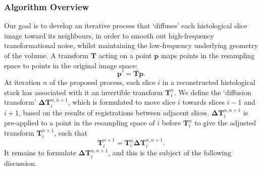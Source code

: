     \subsubsection{Algorithm Overview} %
    \label{ssub:algorithm_overview}
    Our goal is to develop an iterative process that `diffuses' each histological slice image toward its neighbours, in order to smooth out high-frequency transformational noise, whilst maintaining the low-frequency underlying geometry of the volume. A transform $\mathbf{T}$ acting on a point $\mathbf{p}$ maps points in the resampling space to points in the original image space:
  		\begin{equation}
  			\mathbf{p'} = \mathbf{Tp}.
  		\end{equation}
    At iteration $n$ of the proposed process, each slice $i$ in a reconstructed histological stack has associated with it an invertible transform $\mathbf{T}_i^n$. We define the `diffusion transform' $\mathbf{\Delta T}_i^{n,n+1}$, which is formulated to move slice $i$ towards slices $i-1$ and $i+1$, based on the results of registrations between adjacent slices. $\mathbf{\Delta T}_i^{n,n+1}$ is pre-applied to a point in the resampling space of $i$ before $\mathbf{T}_i^n$ to give the adjusted transform $\mathbf{T}_i^{n+1}$, such that
    	\begin{equation}
  			\mathbf{T}_i^{n+1} = \mathbf{T}_i^n \mathbf{\Delta T}_i^{n,n+1}. \label{eqn:adjusted_transforms}
  		\end{equation}
	  It remains to formulate $\mathbf{\Delta T}_i^{n,n+1}$, and this is the subject of the following discussion.
    
